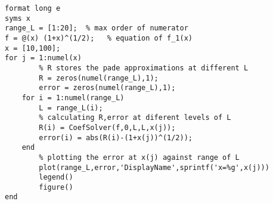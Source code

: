 \lstset{basicstyle=\footnotesize,style=myCustomMatlabStyle}
\begin{lstlisting}
format long e
syms x
range_L = [1:20];  % max order of numerator
f = @(x) (1+x)^(1/2);   % equation of f_1(x)
x = [10,100];
for j = 1:numel(x)
        % R stores the pade approximations at different L
        R = zeros(numel(range_L),1);
        error = zeros(numel(range_L),1);
    for i = 1:numel(range_L)
        L = range_L(i);
        % calculating R,error at diferent levels of L
        R(i) = CoefSolver(f,0,L,L,x(j));
        error(i) = abs(R(i)-(1+x(j))^(1/2));
    end
        % plotting the error at x(j) against range of L
        plot(range_L,error,'DisplayName',sprintf('x=%g',x(j)))
        legend()
        figure()
end

\end{lstlisting}